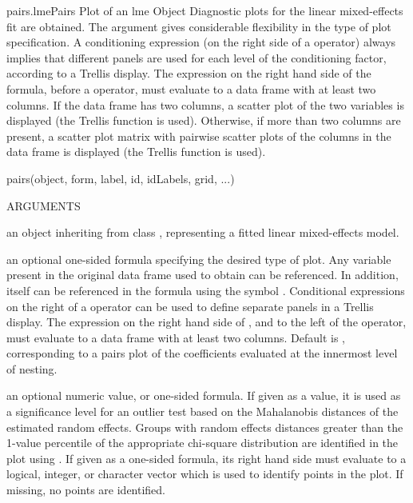 \documentclass[pdftex]{article} \usepackage{url,graphicx}
\renewcommand{\Twiddle}{\mbox{\(\sim\)}}
\begin{document}
\begin{Helpfile}{pairs.lme}{Pairs Plot of an lme Object}
Diagnostic plots for the linear mixed-effects fit are obtained. The
 argument gives considerable flexibility in the type of
plot specification. A conditioning expression (on the right side of a
\Co{|} operator) always implies that different panels are used for
each level of the conditioning factor, according to a Trellis
display. The expression on the right hand side of the formula, before
a \Co{|} operator, must evaluate to a data frame with at least two
columns. If the data frame has two columns, a scatter plot of the two
variables is displayed (the Trellis function  is
used). Otherwise, if more than two columns are present, a scatter plot
matrix with pairwise scatter plots of the columns in the data frame is
displayed (the Trellis function  is used).
\begin{Example}
pairs(object, form, label, id, idLabels, grid, ...)
\end{Example}
\begin{Argument}{ARGUMENTS}
\item[\Co{object:}]
an object inheriting from class , representing
a fitted linear mixed-effects model.
\item[\Co{form:}]
an optional one-sided formula specifying the desired type of
plot. Any variable present in the original data frame used to obtain
 can be referenced. In addition,  itself
can be referenced in the formula using the symbol
. Conditional expressions on the right of a \Co{|}
operator can be used to define separate panels in a Trellis
display. The expression on the right hand side of , and to
the left of the \Co{|} operator, must evaluate to a data frame with
at least two columns. Default is \Co{\Twiddle coef(.) }, corresponding to
a pairs plot of the coefficients evaluated at the innermost level of
nesting.
\item[\Co{id:}]
an optional numeric value, or one-sided formula. If given as
a value, it is used as a significance level for an outlier
test based on the Mahalanobis distances of the estimated random
effects. Groups with random effects distances greater than the
1-value percentile of the appropriate chi-square distribution
are identified in the plot using . If given as a
one-sided formula, its right hand side must evaluate to a  logical,
integer, or character vector which is used to identify points in the
plot. If missing, no points are identified.
\item[\Co{idLabels:}]

\end{Argument}
\end{Helpfile}
\end{document}
